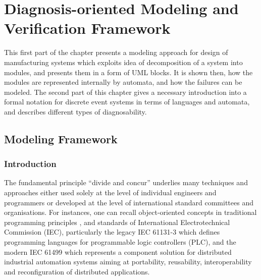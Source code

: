 

\ifx {} \undefined
	\newtheorem{definition}{Definition}
\fi
\ifx \conjecture \undefined
	\newtheorem{conjecture}{Conjecture}
\fi

\chapter{Diagnosis-oriented Modeling and Verification Framework}
\label{chap:framework}

This first part of the chapter presents a modeling approach for design of
manufacturing systems which exploits idea of decomposition of a system into modules, and presents them
in a form of UML blocks. It is shown then, how the modules are
represented internally by automata, and how the failures can be modeled. The
second part of this chapter gives a necessary introduction into a formal
notation for discrete event systems in terms of languages and automata,
and describes different types of diagnosability.

\section{Modeling Framework}

\subsection{Introduction}

The fundamental principle ``divide and concur'' underlies many techniques and
approaches either used solely at the level of individual engineers and
programmers or developed at the level of international standard committees and
organisations. For instances, one can recall object-oriented concepts in
traditional programming principles \cite{farrell_object-oriented_2013}, and
standards of International Electrotechnical Commission (IEC), particularly the
legacy IEC 61131-3 \cite{otto_iec_2009} which defines programming languages for
programmable logic controllers (PLC), and the modern IEC 61499
\cite{vyatkin_iec_2009} which represents a component solution for distributed
industrial automation systems aiming at portability, reusability,
interoperability and reconfiguration of distributed applications.


